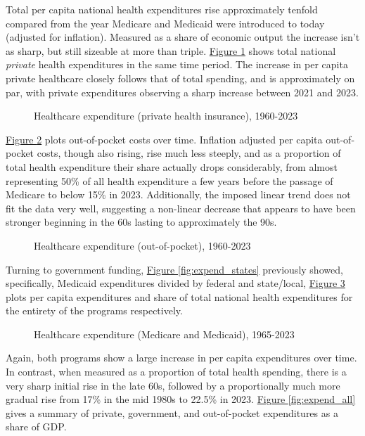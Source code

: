 \documentclass[11pt]{article}
\begin{document}
Total per capita national health expenditures rise approximately tenfold compared from the year Medicare and Medicaid were introduced to today (adjusted for inflation). Measured as a share of economic output the increase isn't as sharp, but still sizeable at more than triple. \hyperref[fig:expend_priv]{Figure \ref*{fig:expend_priv}} shows total national \textit{private} health expenditures in the same time period. The increase in per capita private healthcare closely follows that of total spending, and is approximately on par, with private expenditures observing a sharp increase between 2021 and 2023.

\begin{figure}[H]
  \sffamily
  \caption{Healthcare expenditure (private health insurance), 1960-2023}
  
  \label{fig:expend_priv}
\end{figure}

\hyperref[fig:expend_oop]{Figure \ref*{fig:expend_oop}} plots out-of-pocket costs over time. Inflation adjusted per capita out-of-pocket costs, though also rising, rise much less steeply, and as a proportion of total health expenditure their share actually drops considerably, from almost representing 50\% of all health expenditure a few years before the passage of Medicare to below 15\% in 2023. Additionally, the imposed linear trend does not fit the data very well, suggesting a non-linear decrease that appears to have been stronger beginning in the 60s lasting to approximately the 90s.

\begin{figure}[H]
  \sffamily
  \caption{Healthcare expenditure (out-of-pocket), 1960-2023}
  
  \label{fig:expend_oop}
\end{figure}

Turning to government funding, \hyperref[fig:expend_states]{Figure \ref*{fig:expend_states}} previously showed, specifically, Medicaid expenditures divided by federal and state/local, \hyperref[fig:expend_govt]{Figure \ref*{fig:expend_govt}} plots per capita expenditures and share of total national health expenditures for the entirety of the programs respectively.

\begin{figure}[H]
  \sffamily
  \caption{Healthcare expenditure (Medicare and Medicaid), 1965-2023}
  
  \label{fig:expend_govt}
\end{figure}

Again, both programs show a large increase in per capita expenditures over time. In contrast, when measured as a proportion of total health spending, there is a very sharp initial rise in the late 60s, followed by a proportionally much more gradual rise from 17\% in the mid 1980s to 22.5\% in 2023. \hyperref[fig:expend_all]{Figure \ref*{fig:expend_all}} gives a summary of private, government, and out-of-pocket expenditures as a share of GDP.
\end{document}
